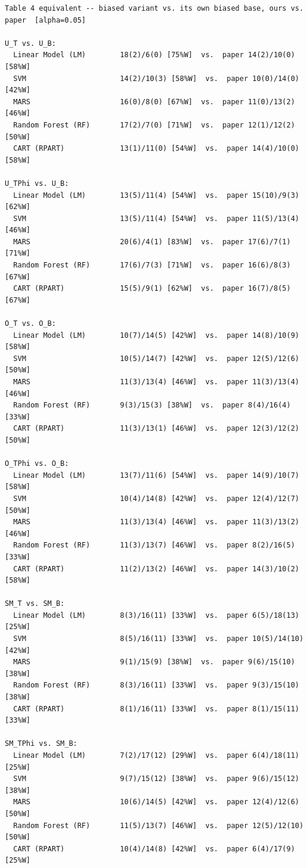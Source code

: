 \begingroup
{}
\label{tab:exp002_cmp_cmp_table4}
\scriptsize
\begin{verbatim}
Table 4 equivalent -- biased variant vs. its own biased base, ours vs. paper  [alpha=0.05]

U_T vs. U_B:
  Linear Model (LM)        18(2)/6(0) [75%W]  vs.  paper 14(2)/10(0) [58%W]
  SVM                      14(2)/10(3) [58%W]  vs.  paper 10(0)/14(0) [42%W]
  MARS                     16(0)/8(0) [67%W]  vs.  paper 11(0)/13(2) [46%W]
  Random Forest (RF)       17(2)/7(0) [71%W]  vs.  paper 12(1)/12(2) [50%W]
  CART (RPART)             13(1)/11(0) [54%W]  vs.  paper 14(4)/10(0) [58%W]

U_TPhi vs. U_B:
  Linear Model (LM)        13(5)/11(4) [54%W]  vs.  paper 15(10)/9(3) [62%W]
  SVM                      13(5)/11(4) [54%W]  vs.  paper 11(5)/13(4) [46%W]
  MARS                     20(6)/4(1) [83%W]  vs.  paper 17(6)/7(1) [71%W]
  Random Forest (RF)       17(6)/7(3) [71%W]  vs.  paper 16(6)/8(3) [67%W]
  CART (RPART)             15(5)/9(1) [62%W]  vs.  paper 16(7)/8(5) [67%W]

O_T vs. O_B:
  Linear Model (LM)        10(7)/14(5) [42%W]  vs.  paper 14(8)/10(9) [58%W]
  SVM                      10(5)/14(7) [42%W]  vs.  paper 12(5)/12(6) [50%W]
  MARS                     11(3)/13(4) [46%W]  vs.  paper 11(3)/13(4) [46%W]
  Random Forest (RF)       9(3)/15(3) [38%W]  vs.  paper 8(4)/16(4) [33%W]
  CART (RPART)             11(3)/13(1) [46%W]  vs.  paper 12(3)/12(2) [50%W]

O_TPhi vs. O_B:
  Linear Model (LM)        13(7)/11(6) [54%W]  vs.  paper 14(9)/10(7) [58%W]
  SVM                      10(4)/14(8) [42%W]  vs.  paper 12(4)/12(7) [50%W]
  MARS                     11(3)/13(4) [46%W]  vs.  paper 11(3)/13(2) [46%W]
  Random Forest (RF)       11(3)/13(7) [46%W]  vs.  paper 8(2)/16(5) [33%W]
  CART (RPART)             11(2)/13(2) [46%W]  vs.  paper 14(3)/10(2) [58%W]

SM_T vs. SM_B:
  Linear Model (LM)        8(3)/16(11) [33%W]  vs.  paper 6(5)/18(13) [25%W]
  SVM                      8(5)/16(11) [33%W]  vs.  paper 10(5)/14(10) [42%W]
  MARS                     9(1)/15(9) [38%W]  vs.  paper 9(6)/15(10) [38%W]
  Random Forest (RF)       8(3)/16(11) [33%W]  vs.  paper 9(3)/15(10) [38%W]
  CART (RPART)             8(1)/16(11) [33%W]  vs.  paper 8(1)/15(11) [33%W]

SM_TPhi vs. SM_B:
  Linear Model (LM)        7(2)/17(12) [29%W]  vs.  paper 6(4)/18(11) [25%W]
  SVM                      9(7)/15(12) [38%W]  vs.  paper 9(6)/15(12) [38%W]
  MARS                     10(6)/14(5) [42%W]  vs.  paper 12(4)/12(6) [50%W]
  Random Forest (RF)       11(5)/13(7) [46%W]  vs.  paper 12(5)/12(10) [50%W]
  CART (RPART)             10(4)/14(8) [42%W]  vs.  paper 6(4)/17(9) [25%W]

\end{verbatim}
\endgroup
